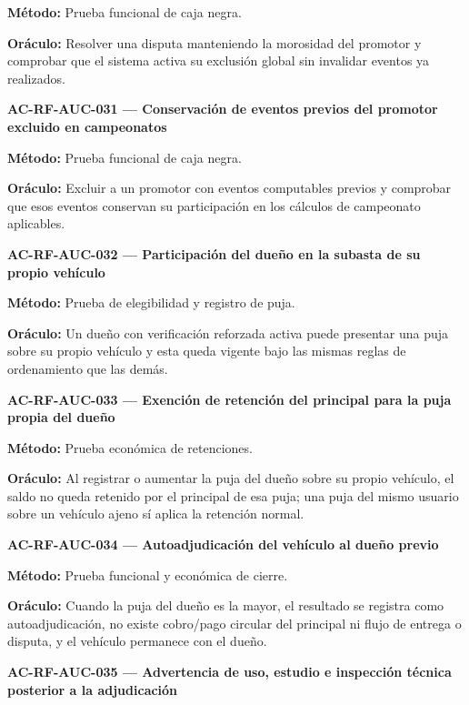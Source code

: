 \documentclass[10pt,letterpaper]{article}
\begin{document}
\textbf{Método:} Prueba funcional de caja negra.\par
\textbf{Oráculo:} Resolver una disputa manteniendo la morosidad del promotor y comprobar que el sistema activa su exclusión global sin invalidar eventos ya realizados.\par\vspace{0.45em}
\noindent\textbf{AC-RF-AUC-031 --- Conservación de eventos previos del promotor excluido en campeonatos}\par
\textbf{Método:} Prueba funcional de caja negra.\par
\textbf{Oráculo:} Excluir a un promotor con eventos computables previos y comprobar que esos eventos conservan su participación en los cálculos de campeonato aplicables.\par\vspace{0.45em}
\noindent\textbf{AC-RF-AUC-032 --- Participación del dueño en la subasta de su propio vehículo}\par
\textbf{Método:} Prueba de elegibilidad y registro de puja.\par
\textbf{Oráculo:} Un dueño con verificación reforzada activa puede presentar una puja sobre su propio vehículo y esta queda vigente bajo las mismas reglas de ordenamiento que las demás.\par\vspace{0.45em}
\noindent\textbf{AC-RF-AUC-033 --- Exención de retención del principal para la puja propia del dueño}\par
\textbf{Método:} Prueba económica de retenciones.\par
\textbf{Oráculo:} Al registrar o aumentar la puja del dueño sobre su propio vehículo, el saldo no queda retenido por el principal de esa puja; una puja del mismo usuario sobre un vehículo ajeno sí aplica la retención normal.\par\vspace{0.45em}
\noindent\textbf{AC-RF-AUC-034 --- Autoadjudicación del vehículo al dueño previo}\par
\textbf{Método:} Prueba funcional y económica de cierre.\par
\textbf{Oráculo:} Cuando la puja del dueño es la mayor, el resultado se registra como autoadjudicación, no existe cobro/pago circular del principal ni flujo de entrega o disputa, y el vehículo permanece con el dueño.\par\vspace{0.45em}
\noindent\textbf{AC-RF-AUC-035 --- Advertencia de uso, estudio e inspección técnica posterior a la adjudicación}\par
\end{document}
